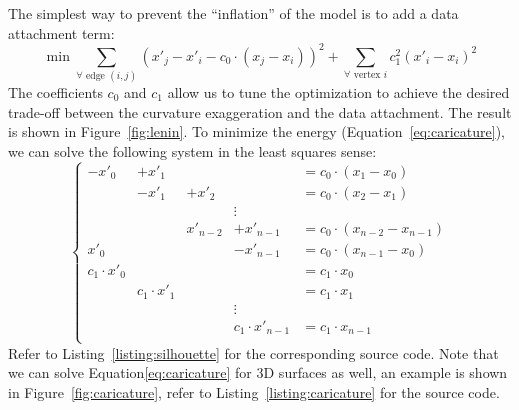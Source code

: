 \documentclass[notitlepage,oneside]{book}
\begin{document}
The simplest way to prevent the ``inflation'' of the model is to add a data attachment term:
\begin{equation}
\label{eq:caricature}
\min \sum\limits_{\forall \text{~edge~} (i,j)} \left(x'_j - x'_i -  c_0\cdot\left(x_j - x_i\right)  \right)^2 + \sum\limits_{\forall \text{~vertex~} i} c_1^2 \left( x'_i - x_i \right)^2
\end{equation}
The coefficients $c_0$ and $c_1$ allow us to tune the optimization to achieve the desired trade-off between the curvature exaggeration and the data attachment.
The result is shown in Figure~\ref{fig:lenin}.
To minimize the energy (Equation~\eqref{eq:caricature}), we can solve the following system in the least squares sense:
\begin{equation}
\label{eq:carsyst}
\left \{ \begin{array}{ccccl}
-x'_0 & + x'_1      &       &               & =  c_0\cdot \left( x_1 - x_0\right)  \\
     & - x'_1      & +x'_2      &           & =  c_0 \cdot \left(x_2 - x_1\right)  \\
    &       &       & \vdots    &             \\
    &            & x'_{n-2}   &    +x'_{n-1}       & =  c_0 \cdot \left(x_{n-2} - x_{n-1}\right)  \\
x'_0 &            &    &    -x'_{n-1}       & =  c_0 \cdot \left(x_{n-1} - x_0\right)  \\
c_1\cdot x'_0 &            &       &               & =  c_1\cdot x_0  \\
& c_1\cdot x'_1            &       &               & =  c_1\cdot x_1  \\
    &       &       & \vdots    &             \\
&             &       &    c_1\cdot x'_{n-1}           & =  c_1\cdot x_{n-1}  \\
\end{array} \right.
\end{equation}
Refer to Listing~\ref{listing:silhouette} for the corresponding source code. Note that we can solve Equation\eqref{eq:caricature} for 3D surfaces as well, an example is shown in Figure~\ref{fig:caricature},
refer to Listing~\ref{listing:caricature} for the source code.
\end{document}

